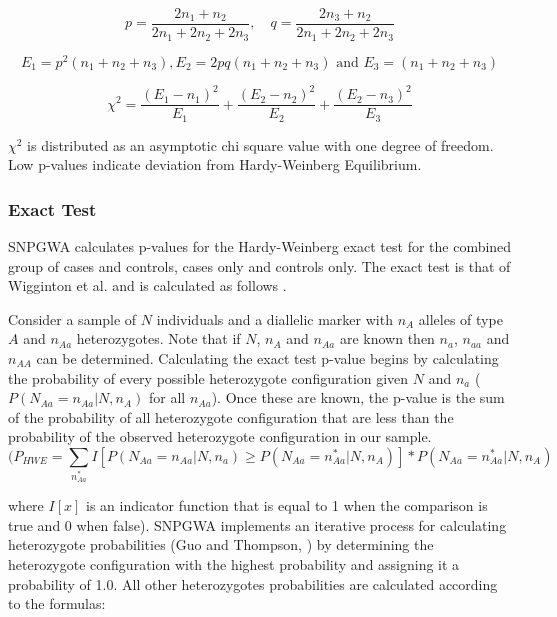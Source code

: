 \begin{equation*}
  p = \frac{2n_1 + n_2}{2n_1 + 2n_2 + 2n_3}, \quad  q = \frac{2n_3 +n_2}{2n_1 + 2n_2 + 2n_3}
\end{equation*}

\begin{equation*}
  E_1=p^2(n_1 + n_2 +n_3), E_2 = 2pq(n_1 + n_2 +n_3) \text{ and } E_3=(n_1 + n_2 +n_3)
\end{equation*}

\begin{equation*}
  \chi^2 = \frac{(E_1 - n_1)^2}{E_1} + \frac{(E_2 - n_2)^2}{E_2} + \frac{(E_2 - n_3)^2}{E_3}
\end{equation*}

$\chi^2$ is distributed as an asymptotic chi square value with one degree of
freedom.  Low p-values indicate deviation from Hardy-Weinberg Equilibrium.

\subsubsection{Exact Test}
\label{exact-test}
SNPGWA calculates p-values for the Hardy-Weinberg exact test for the combined
group of cases and controls, cases only and controls only.  The exact test is
that of Wigginton et al. and is calculated as follows \cite{Wiggington05}.

Consider a sample of $N$ individuals and a diallelic marker with $n_A$ alleles of
type $A$ and $n_{Aa}$ heterozygotes.  Note that if $N$, $n_A$ and $n_{Aa}$ are
known then $n_a$, $n_{aa}$ and $n_{AA}$ can be determined.  Calculating the
exact test p-value begins by calculating the probability of every possible
heterozygote configuration given $N$ and $n_a$ ($P(N_{Aa} = n_{Aa} |N,n_A)$ for
all $n_{Aa}$). Once these are known, the p-value is the sum of the probability
of all heterozygote configuration that are less than the probability of the
observed heterozygote configuration in our sample.
\begin{equation*}
(P_{HWE}=\sum_{n^*_{Aa}}I[P(N_{Aa} = n_{Aa}|N,n_a)\geq P(N_{Aa} = n^*_{Aa}|N,n_A)] * P(N_{Aa} = n^*_{Aa}|N,n_A)
\end{equation*}

\vspace{1em}
where $I[x]$ is an indicator function that is equal to 1 when the
comparison is true and 0 when false).  SNPGWA implements an iterative process
for calculating heterozygote probabilities (Guo and Thompson, \cite{Guo92}) by
determining the heterozygote configuration with the highest probability and
assigning it a probability of 1.0.  All other heterozygotes probabilities are
calculated according to the formulas:
\vspace{1em}

